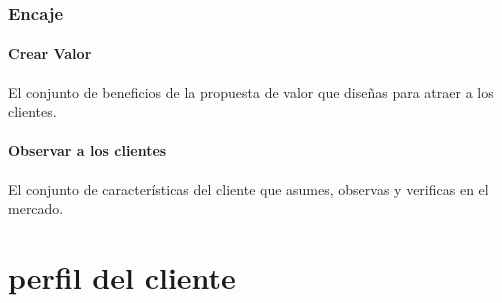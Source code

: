 \documentclass[11pt]{book}
\begin{document}
\subsubsection{Encaje}
\paragraph{Crear Valor}
El conjunto de beneficios de la propuesta de valor que diseñas para atraer a los clientes.
\paragraph{Observar a los clientes}
El conjunto de características del cliente que asumes, observas y verificas en el mercado.
\section{perfil del cliente}
\end{document}
